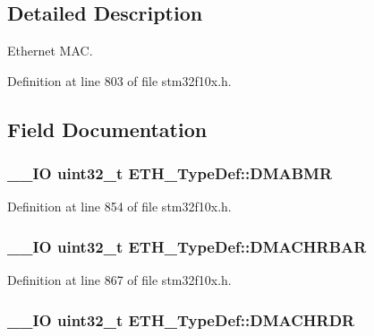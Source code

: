 \subsection{Detailed Description}
Ethernet M\-A\-C. 

Definition at line 803 of file stm32f10x.\-h.



\subsection{Field Documentation}
\hypertarget{struct_e_t_h___type_def_a32b1c260b8ab0b3f67cbfa97f4d910d1}{
\subsubsection[{D\-M\-A\-B\-M\-R}]{\setlength{\rightskip}{0pt plus 5cm}\-\_\-\-\_\-\-I\-O {\bf uint32\-\_\-t} E\-T\-H\-\_\-\-Type\-Def\-::\-D\-M\-A\-B\-M\-R}}\label{struct_e_t_h___type_def_a32b1c260b8ab0b3f67cbfa97f4d910d1}


Definition at line 854 of file stm32f10x.\-h.

\hypertarget{struct_e_t_h___type_def_a03160db5ffae457bab55c0358c4ef998}{
\subsubsection[{D\-M\-A\-C\-H\-R\-B\-A\-R}]{\setlength{\rightskip}{0pt plus 5cm}\-\_\-\-\_\-\-I\-O {\bf uint32\-\_\-t} E\-T\-H\-\_\-\-Type\-Def\-::\-D\-M\-A\-C\-H\-R\-B\-A\-R}}\label{struct_e_t_h___type_def_a03160db5ffae457bab55c0358c4ef998}


Definition at line 867 of file stm32f10x.\-h.

\hypertarget{struct_e_t_h___type_def_ab4a222f725cc43952993519b20466637}{
\subsubsection[{D\-M\-A\-C\-H\-R\-D\-R}]{\setlength{\rightskip}{0pt plus 5cm}\-\_\-\-\_\-\-I\-O {\bf uint32\-\_\-t} E\-T\-H\-\_\-\-Type\-Def\-::\-D\-M\-A\-C\-H\-R\-D\-R}}\label{struct_e_t_h___type_def_ab4a222f725cc43952993519b20466637}


